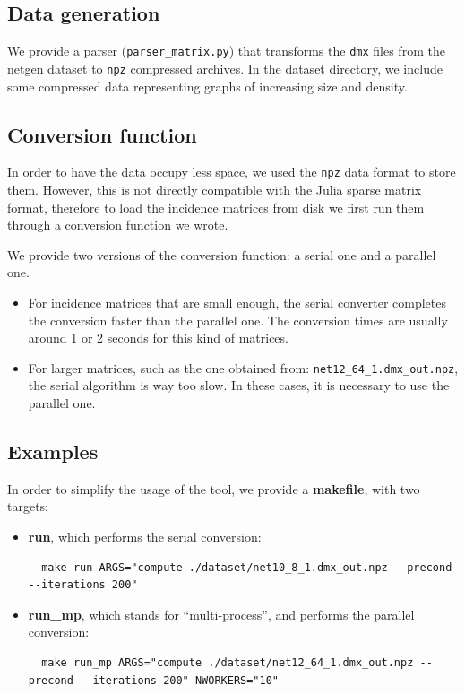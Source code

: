 \documentclass{article}
\begin{document}
\subsection{Data generation} We provide a parser (\texttt{parser\_matrix.py}) that transforms the \texttt{dmx} files from the netgen dataset to \texttt{npz} compressed archives. In the dataset directory, we include some compressed data representing graphs of increasing size and density.

\subsection{Conversion function}
In order to have the data occupy less space, we used the \texttt{npz} data format to store them. However, this is not directly compatible with the Julia sparse matrix format, therefore to load the incidence matrices from disk we first run them through a conversion function we wrote. \medskip

\noindent We provide two versions of the conversion function: a serial one and a parallel one.

\begin{itemize}
 \item For incidence matrices that are small enough, the serial converter completes the conversion faster than the parallel one. The conversion times are usually around 1 or 2 seconds for this kind of matrices.
 \item For larger matrices, such as the one obtained from: \texttt{net12\_64\_1.dmx\_out.npz}, the serial algorithm is way too slow. In these cases, it is necessary to use the parallel one.

\end{itemize}


\subsection{Examples}

In order to simplify the usage of the tool, we provide a \textbf{makefile}, with two targets:

\begin{itemize}
 \item \textbf{run}, which performs the serial conversion:

 \begin{lstlisting}
  make run ARGS="compute ./dataset/net10_8_1.dmx_out.npz --precond --iterations 200"
 \end{lstlisting}


 \item \textbf{run\_mp}, which stands for ``multi-process'', and performs the parallel conversion:
  \begin{lstlisting}
  make run_mp ARGS="compute ./dataset/net12_64_1.dmx_out.npz --precond --iterations 200" NWORKERS="10"
 \end{lstlisting}
\end{itemize}
\end{document}
